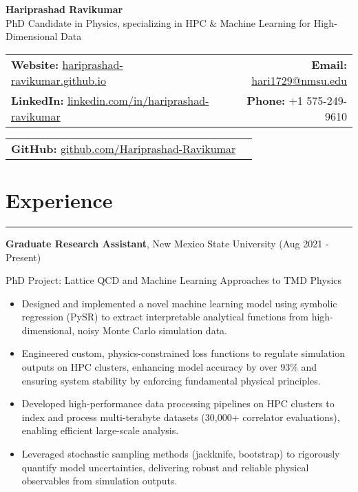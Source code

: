 \documentclass[11pt]{article}
\begin{document}
\begin{center}
  \textbf{\Huge Hariprashad Ravikumar} \\[0.6em]
  \vspace{0.5em}
  PhD Candidate in Physics, specializing in HPC \& Machine Learning for High‐Dimensional Data \\
\end{center}

\begin{tabularx}{\textwidth}{@{}Xr@{}}
    \textbf{Website:} \href{https://hariprashad-ravikumar.github.io}{hariprashad-ravikumar.github.io} & \textbf{Email:} \href{mailto:hari1729@nmsu.edu}{hari1729@nmsu.edu}  \\
    \textbf{LinkedIn:} \href{https://www.linkedin.com/in/hariprashad-ravikumar}{linkedin.com/in/hariprashad-ravikumar} & \textbf{Phone:} +1 575-249-9610 
\end{tabularx}
\vspace{-1em}
\begin{tabularx}{\textwidth}{@{}Xr@{}}
\textbf{GitHub:} \href{https://github.com/Hariprashad-Ravikumar}{github.com/Hariprashad-Ravikumar}  \\
\end{tabularx}


\section*{Experience}
\hrule
\vspace{-0.3em}
\textbf{Graduate Research Assistant}, New Mexico State University \hfill (Aug 2021 - Present)
\vspace{-0.2em}

PhD Project: Lattice QCD and Machine Learning Approaches to TMD Physics
\vspace{-0.5em}
\begin{itemize}
    \item Designed and implemented a novel machine learning model using symbolic regression (PySR) to extract interpretable analytical functions from high-dimensional, noisy Monte Carlo simulation data.
    \vspace{-1.5em}
    \item Engineered custom, physics-constrained loss functions to regulate simulation outputs on HPC clusters, enhancing model accuracy by over 93\% and ensuring system stability by enforcing fundamental physical principles.
    \vspace{-0.5em}
    \item Developed high-performance data processing pipelines on HPC clusters to index and process multi-terabyte datasets (30,000+ correlator evaluations), enabling efficient large-scale analysis.
    \vspace{-0.5em}
    \item Leveraged stochastic sampling methods (jackknife, bootstrap) to rigorously quantify model uncertainties, delivering robust and reliable physical observables from simulation outputs.
\end{itemize}
\end{document}
